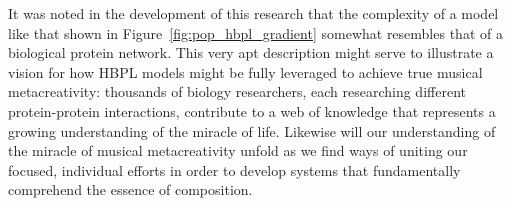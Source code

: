\documentclass[letterpaper]{article}
\begin{document}
It was noted in the development of this research that the complexity of a model like that shown in Figure~\ref{fig:pop_hbpl_gradient} somewhat resembles that of a biological protein network. This very apt description might serve to illustrate a vision for how HBPL models might be fully leveraged to achieve true musical metacreativity: thousands of biology researchers, each researching different protein-protein interactions, contribute to a web of knowledge that represents a growing understanding of the miracle of life. Likewise will our understanding of the miracle of musical metacreativity unfold as we find ways of uniting our focused, individual efforts in order to develop systems that fundamentally comprehend the essence of composition.



\end{document}
